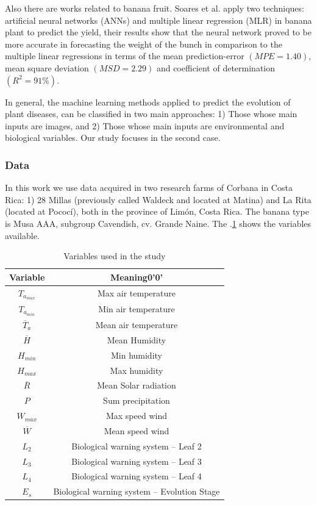 \documentclass[review,authoryear,english]{elsarticle}
\begin{document}
Also there are works related to banana fruit. Soares et al. \citep{Soares2014} apply two techniques: artificial neural networks (ANNs) and multiple linear regression (MLR) in banana plant to predict the yield, their results show that the neural network proved to be more accurate in forecasting the weight of the bunch in comparison to the multiple linear regressions in terms of the mean prediction-error $(MPE = 1.40)$, mean square deviation $(MSD = 2.29)$ and coefficient of determination $(R^2 = 91\%)$.

In general, the machine learning methods applied to predict the evolution of plant diseases, can be classified in two main approaches: 1) Those whose main inputs are images, and 2) Those whose main inputs are environmental and biological variables. Our study focuses in the second case.

\subsubsection{Data}
In this work we use data acquired in two research farms of Corbana in Costa Rica: 1) 28 Millas (previously called Waldeck and located at Matina) and La Rita (located at Pococí), both in the province of Limón, Costa Rica. The banana type is Musa AAA, subgroup Cavendish, cv. Grande Naine. The \tablename $.$\ref{tabla1} shows the variables available.

\begin{table}[h] 
\caption{Variables used in the study} 
\label{tabla1} 
\centering
\begin{tabular}{c|c} 
\hline
\bfseries Variable & \bfseries Meaning0'0' \\ 
\hline\hline 
$T_{a_{max}}$ &	Max air temperature \\
$T_{a_{min}}$ &	Min air temperature \\
$\overline{T}_{a}$	 & Mean air temperature \\
$\overline{H}$	&  Mean Humidity \\
$H_{min}$ &	Min humidity \\
$H_{max}$	& Max humidity \\
$\overline{R}$	& Mean Solar radiation \\
$P$	& Sum precipitation  \\
$W_{max}$	& Max speed wind \\
$\overline{W}$	& Mean speed wind  \\
$L_2$	& Biological warning system – Leaf 2 \\
$L_3$	& Biological warning system – Leaf 3 \\
$L_4$	& Biological warning system – Leaf 4 \\
$E_s$	& Biological warning system – Evolution Stage \\
\hline
\end{tabular} 
\end{table}
\end{document}
